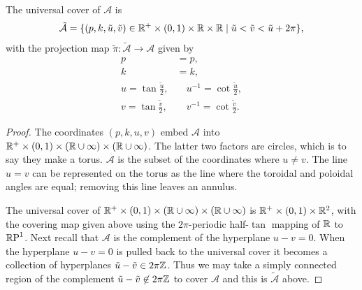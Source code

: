 \documentclass{article}
\begin{document}
\begin{lem}
    \label{lem:mathcal tilde C}
The universal cover of $\mathcal{A}$ is
\[
\mathcal{\tilde{A}} =
\{(p, k,\tilde{u},\tilde{v}) \in \mathbb{R}^+\times(0,1)\times\mathbb{R}\times\mathbb{R} \mid  \tilde{u} < \tilde{v} < \tilde{u} + 2\pi \},
\]
with the projection map $\tilde{\pi} : \mathcal{\tilde{A}} \to \mathcal{A}$ given by
\begin{align*}
    p &= p, \\
    k &= k, \\
    u = \tan \frac{\tilde{u}}{2},       &\quad
        u^{-1} = \cot \frac{\tilde{u}}{2},  \\
    v = \tan \frac{\tilde{v}}{2},       &\quad
        v^{-1} = \cot \frac{\tilde{v}}{2}.
\end{align*}

\begin{proof}
The coordinates $(p,k,u,v)$ embed $\mathcal{A}$ into $\mathbb{R}^+\times(0,1)\times(\mathbb{R} \cup\infty)\times(\mathbb{R} \cup\infty)$.
The latter two factors are circles, which is to say they make a torus. $\mathcal{A}$ is the subset of the coordinates where $u\neq v$. The line $u=v$ can be represented on the torus as the line where the toroidal and poloidal angles are equal; removing this line leaves an annulus.

The universal cover of $\mathbb{R}^+\times(0,1)\times(\mathbb{R} \cup\infty)\times(\mathbb{R} \cup\infty)$ is $\mathbb{R}^+\times(0,1)\times\mathbb{R}^2$, with the covering map given above using the $2\pi$-periodic half-$\tan$ mapping of $\mathbb{R}$ to $\mathbb{R}\text{P}^1$. Next recall that $\mathcal{A}$ is the complement of the hyperplane $u-v = 0$. When the hyperplane $u-v=0$ is pulled back to the universal cover it becomes a collection of hyperplanes $\tilde{u}-\tilde{v} \in 2\pi\mathbb{Z}$. Thus we may take a simply connected region of the complement $\tilde{u}-\tilde{v} \not\in 2\pi\mathbb{Z}$ to cover $\mathcal{A}$ and this is $\mathcal{\tilde{A}}$ above.




\end{proof}
\end{lem}
\end{document}

